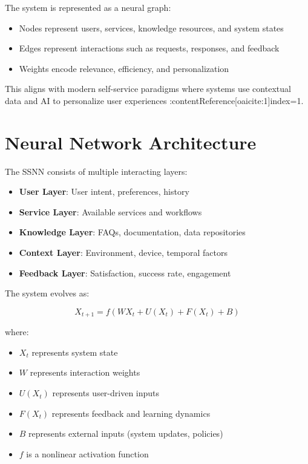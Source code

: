 \documentclass[12pt]{article}
\begin{document}
The system is represented as a neural graph:

\begin{itemize}
\item Nodes represent users, services, knowledge resources, and system states
\item Edges represent interactions such as requests, responses, and feedback
\item Weights encode relevance, efficiency, and personalization
\end{itemize}

This aligns with modern self-service paradigms where systems use contextual data and AI to personalize user experiences :contentReference[oaicite:1]{index=1}.

\section{Neural Network Architecture}

The SSNN consists of multiple interacting layers:

\begin{itemize}
\item \textbf{User Layer}: User intent, preferences, history
\item \textbf{Service Layer}: Available services and workflows
\item \textbf{Knowledge Layer}: FAQs, documentation, data repositories
\item \textbf{Context Layer}: Environment, device, temporal factors
\item \textbf{Feedback Layer}: Satisfaction, success rate, engagement
\end{itemize}

The system evolves as:

\[
X_{t+1} = f(WX_t + U(X_t) + F(X_t) + B)
\]

where:
\begin{itemize}
\item $X_t$ represents system state
\item $W$ represents interaction weights
\item $U(X_t)$ represents user-driven inputs
\item $F(X_t)$ represents feedback and learning dynamics
\item $B$ represents external inputs (system updates, policies)
\item $f$ is a nonlinear activation function
\end{itemize}
\end{document}
